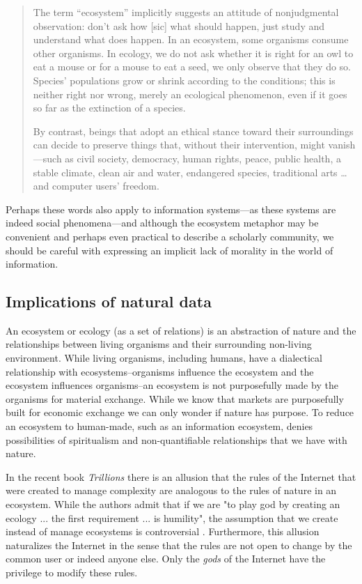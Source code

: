 \begin{quote}
The term “ecosystem” implicitly suggests an attitude of nonjudgmental observation: don't ask how [sic] what should happen, just study and understand what does happen. In an ecosystem, some organisms consume other organisms. In ecology, we do not ask whether it is right for an owl to eat a mouse or for a mouse to eat a seed, we only observe that they do so. Species' populations grow or shrink according to the conditions; this is neither right nor wrong, merely an ecological phenomenon, even if it goes so far as the extinction of a species.

By contrast, beings that adopt an ethical stance toward their surroundings can decide to preserve things that, without their intervention, might vanish—such as civil society, democracy, human rights, peace, public health, a stable climate, clean air and water, endangered species, traditional arts … and computer users' freedom. \citep{fsf_2014}
\end{quote}

Perhaps these words also apply to information systems—as these systems are indeed social phenomena—and although the ecosystem metaphor may be convenient and perhaps even practical to describe a scholarly community, we should be careful with expressing an implicit lack of morality in the world of information. 

\subsection{Implications of natural data}

An ecosystem or ecology (as a set of relations) is an abstraction of nature and the relationships between living organisms and their surrounding non-living environment. While living organisms, including humans, have a dialectical relationship with ecosystems--organisms influence the ecosystem and the ecosystem influences organisms--an ecosystem is not purposefully made by the organisms for material exchange. While we know that markets are purposefully built for economic exchange we can only wonder if nature has purpose. To reduce an ecosystem to human-made, such as an information ecosystem, denies possibilities of spiritualism and non-quantifiable relationships that we have with nature.

In the recent book \textit{Trillions} there is an allusion that the rules of the Internet that were created to manage complexity are analogous to the rules of nature in an ecosystem. While the authors admit that if we are "to play god by creating an ecology ... the first requirement ... is humility", the assumption that we create instead of manage ecosystems is controversial \citep[][p. 140]{lucas_2012}. Furthermore, this allusion naturalizes the Internet in the sense that the rules are not open to change by the common user or indeed anyone else. Only the \textit{gods} of the Internet have the privilege to modify these rules.

